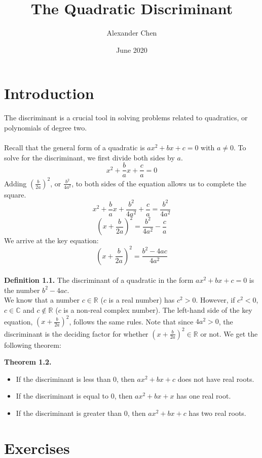 \documentclass{article}
\title{The Quadratic Discriminant}
\author{Alexander Chen}
\date{June 2020}
\begin{document}
\maketitle

\section{Introduction}
The discriminant is a crucial tool in solving problems related to quadratics, or polynomials of degree two.\\\\

Recall that the general form of a quadratic is $ax^2+bx+c=0$ with $a\neq0$. To solve for the discriminant, we first divide both sides by $a$. $$x^2+\frac{b}{a}x+\frac{c}{a}=0$$
Adding $(\frac{b}{2a})^2$, or $\frac{b^2}{4a^2}$, to both sides of the equation allows us to complete the square.
$$x^2+\frac{b}{a}x+\frac{b^2}{4a^2}+\frac{c}{a}=\frac{b^2}{4a^2}$$
$$(x+\frac{b}{2a})^2=\frac{b^2}{4a^2}-\frac{c}{a}$$
We arrive at the key equation:
$$(x+\frac{b}{2a})^2=\frac{b^2-4ac}{4a^2}$$\\

\textbf{Definition 1.1.} The discriminant of a quadratic in the form $ax^2+bx+c=0$ is the number $b^2-4ac$.\\

We know that a number $c \in \mathbb{R}$ ($c$ is a real number) has $c^2>0$. However, if $c^2<0$, $c \in \mathbb{C}$ and $c \not\in \mathbb{R}$ ($c$ is a non-real complex number). The left-hand side of the key equation, $(x+\frac{b}{2a})^2$, follows the same rules. Note that since $4a^2 > 0$, the discriminant is the deciding factor for whether $(x+\frac{b}{2a})^2 \in \mathbb{R}$ or not. We get the following theorem:\\

\begin{mdframed}
    \textbf{Theorem 1.2.}
    \begin{itemize}
        \item If the discriminant is less than 0, then $ax^2+bx+c$ does not have real roots.
        \item If the discriminant is equal to 0, then $ax^2+bx+x$ has one real root.
        \item If the discriminant is greater than 0, then $ax^2+bx+c$ has two real roots.
    \end{itemize}
\end{mdframed}

\section{Exercises}
\end{document}
